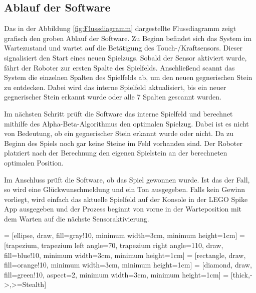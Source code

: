 \subsection{Ablauf der Software}
Das in der Abbildung \ref{fig:Flussdiagramm} dargestellte Flussdiagramm zeigt grafisch den groben Ablauf der Software. \newline
Zu Beginn befindet sich das System im Wartezustand und wartet auf die Betätigung des Touch-/Kraftsensors. Dieser signalisiert den Start eines neuen Spielzugs. Sobald der Sensor aktiviert wurde, fährt der Roboter zur ersten Spalte des Spielfelds.
Anschließend scannt das System die einzelnen Spalten des Spielfelds ab, um den neuen gegnerischen Stein zu entdecken. Dabei wird das interne Spielfeld aktualisiert, bis ein neuer gegnerischer Stein erkannt wurde oder alle 7 Spalten gescannt wurden.

Im nächsten Schritt prüft die Software das interne Spielfeld und berechnet mithilfe des Alpha-Beta-Algorithmus den optimalen Spielzug.
Dabei ist es nicht von Bedeutung, ob ein gegnerischer Stein erkannt wurde oder nicht. Da zu Beginn des Spiels noch gar keine Steine im Feld vorhanden sind.
Der Roboter platziert nach der Berechnung den eigenen Spielstein an der berechneten optimalen Position.

Im Anschluss prüft die Software, ob das Spiel gewonnen wurde. Ist das der Fall, so wird eine Glückwunschmeldung und ein Ton ausgegeben. Falls kein Gewinn vorliegt, wird einfach das aktuelle Spielfeld auf der Konsole in der LEGO Spike App ausgegeben und der Prozess beginnt von vorne in der Warteposition mit dem Warten auf die nächste Sensoraktivierung. 


 = [ellipse, draw, fill=gray!10, minimum width=3cm, minimum height=1cm]
 = [trapezium, trapezium left angle=70, trapezium right angle=110, draw, fill=blue!10, minimum width=3cm, minimum height=1cm]
 = [rectangle, draw, fill=orange!10, minimum width=3cm, minimum height=1cm]
 = [diamond, draw, fill=green!10, aspect=2, minimum width=3cm, minimum height=1cm]
 = [thick,->,>=Stealth]

